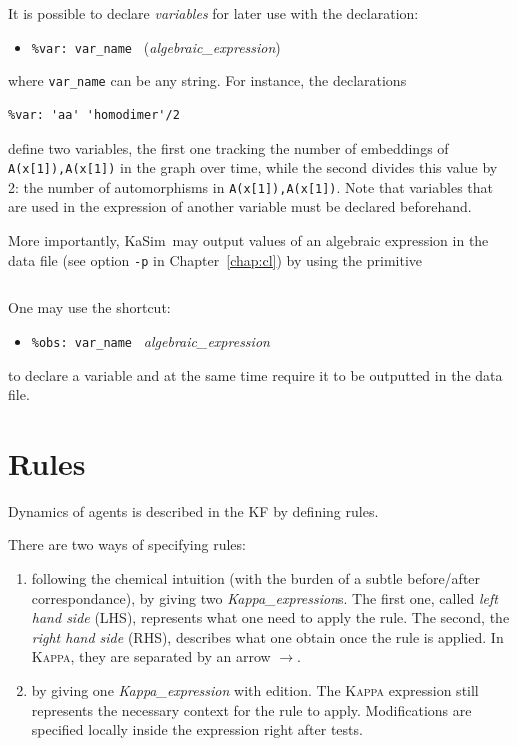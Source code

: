 \documentclass[11pt]{book}
\def\Kappa{\textsc{Kappa}}
\def\KaSim{\textsf{KaSim}}
\def\ttt#1{\texttt{#1}}
\def\var#1{{\textquotesingle}#1{\textquotesingle}}
\def\rar{\rightarrow}
\def\ITE#1{\begin{itemize}#1\end{itemize}}
\begin{document}
It is possible to declare
\emph{variables} for later use with the declaration: \ITE{
\item[] \ttt{\%var: \var{var\_name}~} (\textit{algebraic\_expression})
} where \ttt{var\_name} can be any string.  For instance, the
declarations
\begin{lstlisting}[language=kappa]
%var: 'homodimer' |A(x[1]),A(x[1])|
%var: 'aa' 'homodimer'/2
\end{lstlisting}
define two variables, the first one tracking the number of embeddings
of \ttt{A(x[1]),A(x[1])} in the graph over time, while the second
divides this value by 2: the number of automorphisms in
\ttt{A(x[1]),A(x[1])}. Note that variables that are used in the
expression of another variable must be declared beforehand.

More importantly, \KaSim~may output values of an algebraic expression
in the data file (see option \ttt{-p} in
Chapter~\ref{chap:cl}) by using the primitive
\begin{lstlisting}[language=kappa]
%plot: 'var_name'
\end{lstlisting}

One may use the shortcut:
\ITE{
\item[] \ttt{\%obs: {\textquotesingle}var\_name{\textquotesingle} }
  \textit{algebraic\_expression}} to declare a variable and at the
same time require it to be outputted in the data file.

\section{Rules}\label{sec:rules}

Dynamics of agents is described in the KF by defining
rules.

There are two ways of specifying rules:
\begin{enumerate}
  \item following the chemical intuition (with the burden of a subtle
    before/after correspondance), by giving two {\it
      Kappa\_expression}s. The first one, called \emph{left hand
      side} (LHS), represents what one need to
    apply the rule. The second, the \emph{right hand side} (RHS), describes what one obtain once the rule is
    applied. In \Kappa{}, they are separated by an arrow $\rar$.
  \item by giving one {\it Kappa\_expression} with edition. The
    \Kappa{} expression still represents the necessary context for the
    rule to apply. Modifications are specified locally inside the
    expression right after tests.
\end{enumerate}
\end{document}
